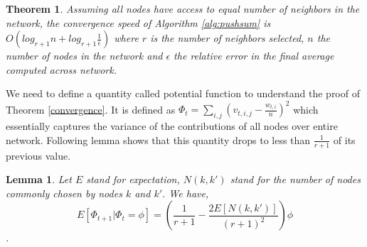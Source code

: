 \documentclass[runningheads,a4paper]{llncs}
\newtheorem{convergence}{Theorem}
\newtheorem{relativeerror}{Lemma}
\begin{document}
\begin{convergence} 
Assuming all nodes have access to equal number of neighbors in the network, the convergence speed of Algorithm \ref{alg:pushsum} is $O(log_{r+1} n + log_{r+1} \frac{1}{\epsilon})$ where $r$ is the number of neighbors selected, $n$ the number of nodes in the network and $\epsilon$ the relative error in the final average computed across network.
\end{convergence}

We need to define a quantity called potential function to understand the proof of Theorem \ref{convergence}. It is defined as $\Phi_t = \sum_{i,j} (v_{t,i,j}-\frac{w_{t,i}}{n})^2$ which essentially captures the variance of the contributions of all nodes over entire network. Following lemma shows that this quantity drops to less than $\frac{1}{r+1}$ of its previous value.

\begin{relativeerror}
Let $E$ stand for expectation, $N(k,k')$ stand for the number of nodes commonly chosen by nodes $k$ and $k'$. We have, $$E[\Phi_{t+1}|\Phi_t=\phi] = \left( \frac{1}{r+1} - \frac{2E[N(k,k')]}{(r+1)^2} \right) \phi $$. 
\end{relativeerror}
\end{document}
